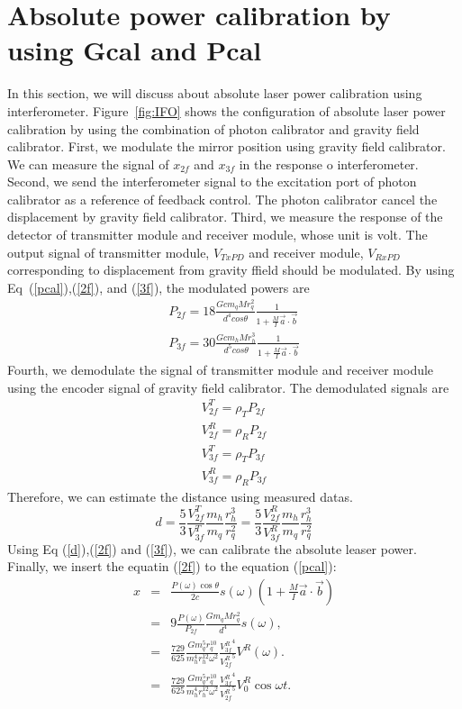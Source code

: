 \documentclass[]{spie}  %
\begin{document}
\section{Absolute power calibration by using Gcal and Pcal}
In this section, we will discuss about absolute laser power calibration using interferometer. 
Figure~\ref{fig:IFO} shows the configuration of absolute laser power calibration by using the combination of photon calibrator and gravity field calibrator.
First, we modulate the mirror position using gravity field calibrator. We can measure the signal of $x_{2f}$ and $x_{3f}$ in the response o interferometer. Second, we send the interferometer signal to the excitation port of photon calibrator as a reference of feedback control. The photon calibrator cancel the displacement by gravity field calibrator. Third, we measure the response of the detector of transmitter module and receiver module, whose unit is volt. The output signal of transmitter module, $V_{TxPD}$ and receiver module, $V_{RxPD}$ corresponding to displacement from gravity ffield should be modulated. By using Eq~(\ref{pcal}),(\ref{2f}), and (\ref{3f}), the modulated powers are
\begin{eqnarray}
 P_{2f}=18 \frac{Gcm_{q}Mr_{q}^2}{d^4cos\theta}\frac{1}{1+\frac{M}{I}\vec{a}\cdot \vec{b}} \label{2f} \\
 P_{3f}= 30\frac{Gcm_{h}Mr_{h}^3}{d^5cos\theta}\frac{1}{1+\frac{M}{I}\vec{a}\cdot \vec{b}} \label{3f}
\end{eqnarray}
Fourth, we demodulate the signal of transmitter module and receiver module using the encoder signal of gravity field calibrator.
The demodulated signals are 
\begin{eqnarray}
V_{2f}^{T}=\rho_{T}P_{2f} \\
V_{2f}^{R}=\rho_{R}P_{2f} \\
V_{3f}^{T}=\rho_{T}P_{3f} \\
V_{3f}^{R}=\rho_{R}P_{3f} 
\end{eqnarray} 
Therefore, we can estimate the distance using measured datas. 
\begin{equation}
d=\frac{5}{3} \frac{V_{2f}^T}{V_{3f}^T}\frac{m_{h}}{m_{q}}\frac{r_{h}^{3}}{r_{q}^{2}}=\frac{5}{3} \frac{V_{2f}^R}{V_{3f}^R}\frac{m_{h}}{m_{q}}\frac{r_{h}^{3}}{r_{q}^{2}} \label{d}
\end{equation}
Using Eq (\ref{d}),(\ref{2f}) and (\ref{3f}), we can calibrate the absolute leaser power.
Finally, we insert the equatin (\ref{2f}) to the equation (\ref{pcal}):
\begin{eqnarray}
x&=&\frac{P(\omega) \cos{\theta}}{2c} s(\omega)\left(1+\frac{M}{I}\vec{a} \cdot \vec{b} \right) \\
 &=&9\frac{P(\omega)}{P_{2f}}\frac{Gm_q M r_q^2}{d^4}s(\omega) , \\
 &=&\frac{729}{625} \frac{G m^5_q r_{q}^{10}}{m^4_h r_h^{12} \omega^2} \frac{{V_{3f}^{R}}^4}{{V_{2f}^{R}}^5}V^R(\omega) .\\
 &=&\frac{729}{625} \frac{G m^5_q r_{q}^{10}}{m^4_h r_h^{12} \omega^2} \frac{{V_{3f}^{R}}^4}{{V_{2f}^{R}}^5}V^R_0 \cos{\omega t} .\\ 
\end{eqnarray}
\end{document}
